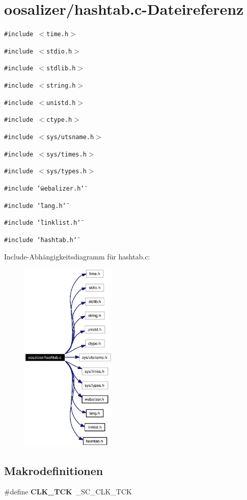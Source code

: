 \section{oosalizer/hashtab.c-Dateireferenz}
\label{hashtab_8c}
{\tt \#include $<$time.h$>$}\par
{\tt \#include $<$stdio.h$>$}\par
{\tt \#include $<$stdlib.h$>$}\par
{\tt \#include $<$string.h$>$}\par
{\tt \#include $<$unistd.h$>$}\par
{\tt \#include $<$ctype.h$>$}\par
{\tt \#include $<$sys/utsname.h$>$}\par
{\tt \#include $<$sys/times.h$>$}\par
{\tt \#include $<$sys/types.h$>$}\par
{\tt \#include \char`\"{}webalizer.h\char`\"{}}\par
{\tt \#include \char`\"{}lang.h\char`\"{}}\par
{\tt \#include \char`\"{}linklist.h\char`\"{}}\par
{\tt \#include \char`\"{}hashtab.h\char`\"{}}\par


Include-Abh\"{a}ngigkeitsdiagramm f\"{u}r hashtab.c:\begin{figure}[H]
\begin{center}
\leavevmode
\includegraphics[width=129pt]{hashtab_8c__incl}
\end{center}
\end{figure}
\subsection*{Makrodefinitionen}
\begin{CompactItemize}
\item 
\#define {\bf CLK\_\-TCK}~\_\-SC\_\-CLK\_\-TCK
\end{CompactItemize}
